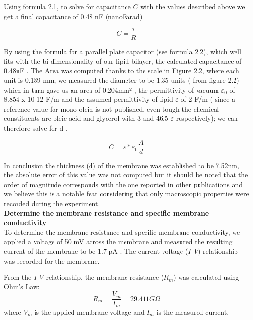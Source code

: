 \documentclass[a4paper,english,12pt,bibliography=totoc]{scrreprt}
\begin{document}
Using formula 2.1, to solve for capacitance \( C \) with the values described above we get a final capacitance of 0.48 nF (nanoFarad)

\begin{equation}
C = \frac{\tau}{R}
\label{eq:capacitance}
\end{equation}

By using the formula for a parallel plate capacitor (see formula 2.2), which well fits with the bi-dimensionality of our lipid bilayer, the calculated capacitance of 0.48nF .
The Area was computed thanks to the scale in Figure 2.2, where each unit is 0.189 mm,  we measured the diameter to be 1.35 units ( from figure 2.2) which in turn gave us an area of 0.204mm² , the permittivity of vacuum $\varepsilon_0$ of 8.854 x 10-12 F/m and the assumed permittivity of lipid $\varepsilon$  of 2 F/m ( since a reference value for mono-olein is not published, even tough the chemical constituents are oleic acid and glycerol with 3 and 46.5 $\varepsilon$ respectively); we can therefore solve for d .


\begin{equation}
    C = \varepsilon * \varepsilon_0 \frac{A}{d} 
\label{eq:time_constant}
\end{equation}

In conclusion the thickness (d) of the membrane was established to be 7.52nm, the absolute error of this value was not computed but it should be noted that the order of magnitude corresponds with the one reported in other publications \cite{article} and we believe this is a notable feat considering that only macroscopic properties were recorded during the experiment.\\  

\textbf{Determine the membrane resistance and specific membrane conductivity}\\
To determine the membrane resistance and specific membrane conductivity, we applied a  voltage of 50 mV across the membrane and measured the resulting current of the membrane to be 1.7 pA . The current-voltage (\textit{I-V}) relationship was recorded for the membrane.


From the \textit{I-V} relationship, the membrane resistance ($R_m$) was calculated using Ohm's Law:
\begin{equation}
R_m = \frac{V_m}{I_m} = 29.411 G\Omega
\end{equation}
where $V_m$ is the applied membrane voltage and $I_m$ is the measured current.
\end{document}
